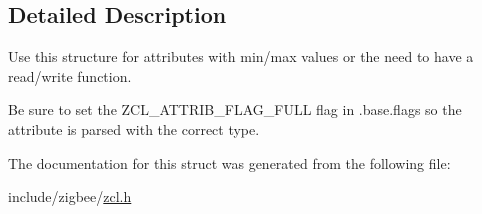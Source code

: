 \subsection{Detailed Description}
Use this structure for attributes with min/max values or the need to have a read/write function. 

Be sure to set the Z\+C\+L\+\_\+\+A\+T\+T\+R\+I\+B\+\_\+\+F\+L\+A\+G\+\_\+\+F\+U\+LL flag in .base.\+flags so the attribute is parsed with the correct type. 

The documentation for this struct was generated from the following file\+:\begin{DoxyCompactItemize}
\item 
include/zigbee/\hyperlink{zcl_8h}{zcl.\+h}\end{DoxyCompactItemize}
